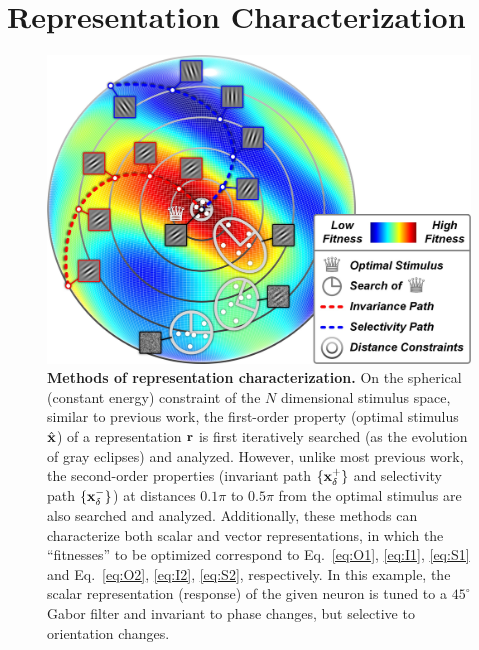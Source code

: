 \documentclass[10pt,twocolumn,letterpaper]{article}
\begin{document}
\section{Representation Characterization}

\begin{figure}
\begin{center}
\includegraphics[width=0.90\columnwidth]{Figs/methods.jpg} 
\end{center}
\caption{{\bf Methods of representation characterization.}
On the spherical (\ie constant energy) constraint of the $N$ dimensional stimulus space, similar to previous work, the first-order property (\ie optimal stimulus $\hat{\bf{x}}$) of a representation $\bf{r}$ is first iteratively searched (as the evolution of gray eclipses) and analyzed.
However, unlike most previous work, the second-order properties (\ie invariant path $\lbrace \bf{x}^{+}_{\delta} \rbrace$ and selectivity path $\lbrace \bf{x}^{-}_{\delta} \rbrace$) at distances $0.1\pi$ to $0.5\pi$ from the optimal stimulus are also searched and analyzed.
Additionally, these methods can characterize both scalar and vector representations, in which the ``fitnesses'' to be optimized correspond to Eq.~\ref{eq:O1}, \ref{eq:I1}, \ref{eq:S1} and Eq.~\ref{eq:O2}, \ref{eq:I2}, \ref{eq:S2}, respectively.
In this example, the scalar representation (\ie response) of the given neuron is tuned to a $45^{\circ}$ Gabor filter and invariant to phase changes, but selective to orientation changes.
}
\label{fig:methods}
\end{figure}

\end{document}
